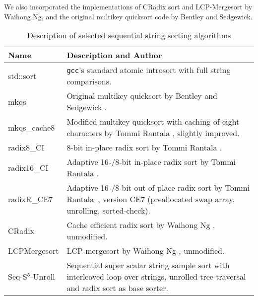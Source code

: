 \documentclass[a4paper]{myjournal}
\begin{document}
We also incorporated the implementations of CRadix sort and LCP-Merge\-sort by
Waihong Ng, and the original multikey quicksort code by Bentley and Sedgewick.

\begin{table}[tb]\centering\normalsize
\caption{Description of selected sequential string sorting algorithms}\label{tab:seqalgo}
\begin{tabularx}{\linewidth}{l|X}
Name             & Description and Author                                                                                                                                        \\ \hline
std::sort        & \texttt{gcc}'s standard atomic introsort with full string comparisons.                                                                                        \\
mkqs             & Original multikey quicksort by Bentley and Sedgewick \cite{bentley1997fast}.                                                                                  \\
mkqs\_cache8     & Modified multikey quicksort with caching of eight characters by Tommi Rantala \cite{rantala2007web}, slightly improved.                                       \\
radix8\_CI       & 8-bit in-place radix sort by Tommi Rantala \cite{karkkainen2009engineering}.                                                                                  \\
radix16\_CI      & Adaptive 16-/8-bit in-place radix sort by Tommi Rantala \cite{karkkainen2009engineering}.                                                                     \\
radixR\_CE7      & Adaptive 16-/8-bit out-of-place radix sort by Tommi Rantala~\cite{karkkainen2009engineering}, version CE7 (preallocated swap array, unrolling, sorted-check). \\
CRadix           & Cache efficient radix sort by Waihong Ng \cite{ng2007cache}, unmodified.                                                                                      \\
LCPMergesort     & LCP-mergesort by Waihong Ng \cite{ng2008merging}, unmodified.                                                                                                 \\
Seq-S$^5$-Unroll & Sequential super scalar string sample sort with interleaved loop over strings, unrolled tree traversal and radix sort as base sorter.                         \\

\end{tabularx}
\end{table}
\end{document}
